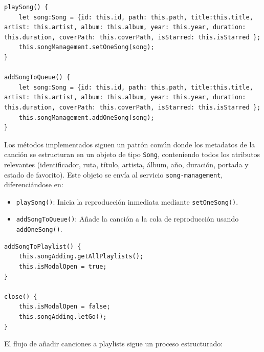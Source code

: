 \documentclass[11pt, a4paper]{article}
\begin{document}
                \begin{lstlisting}[caption={playSong() y addSongToQueue()}]
playSong() {
    let song:Song = {id: this.id, path: this.path, title:this.title, artist: this.artist, album: this.album, year: this.year, duration: this.duration, coverPath: this.coverPath, isStarred: this.isStarred };
    this.songManagement.setOneSong(song);
}

addSongToQueue() {
    let song:Song = {id: this.id, path: this.path, title:this.title, artist: this.artist, album: this.album, year: this.year, duration: this.duration, coverPath: this.coverPath, isStarred: this.isStarred };
    this.songManagement.addOneSong(song);
}
                \end{lstlisting}

                Los métodos implementados siguen un patrón común donde los metadatos de la canción se estructuran en un objeto de tipo \texttt{Song}, conteniendo todos los atributos relevantes (identificador, ruta, título, artista, álbum, año, duración, portada y estado de favorito). Este objeto se envía al servicio \texttt{song-management}, diferenciándose en:

                \begin{itemize}
                    \item \texttt{playSong()}: Inicia la reproducción inmediata mediante \texttt{setOneSong()}.
                    \item \texttt{addSongToQueue()}: Añade la canción a la cola de reproducción usando \texttt{addOneSong()}.
                \end{itemize}

                \begin{lstlisting}[caption={addSongToPlaylist()}]
addSongToPlaylist() {
    this.songAdding.getAllPlaylists();
    this.isModalOpen = true;
}

close() {
    this.isModalOpen = false;
    this.songAdding.letGo();
}
                \end{lstlisting}

                El flujo de añadir canciones a playlists sigue un proceso estructurado:
\end{document}
